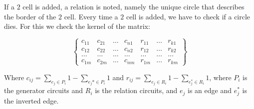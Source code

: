 \documentclass[11pt, a4paper,draft]{report}
\begin{document}
If a $2$ cell is added, a relation is noted, namely the unique circle that describes the border of the $2$ cell. Every time a $2$ cell is added, we have to check if a circle dies. For this we check the kernel of the matrix:
 	
 	
 	$$\begin{Bmatrix}
 	c_{11} & c_{21} & \ldots &c_{n1} & r_{11} & \ldots  & r_{k1}\\
 	c_{12} & c_{22} & \ldots &c_{n2} & r_{12} & \ldots  & r_{k2}\\
 	\ldots & \ldots & \ldots & \ldots & \ldots & \ldots & \ldots \\
 	c_{1m} & c_{2m} & \ldots &c_{nm} & r_{1m} & \ldots  & r_{km}
 	\end{Bmatrix}$$
 	
 	Where $c_{ij} = \sum_{e_j\in P_i} 1 - \sum_{e_j*\in P_i}1$ and $r_{ij} = \sum_{e_j\in R_i} 1 - \sum_{e_j^*\in R_i}1$, where $P_i$ is the generator circuits and $R_i$ is the relation circuits, and $e_j$ is an edge and $e_j^*$ is the inverted edge.
 	
\end{document}
